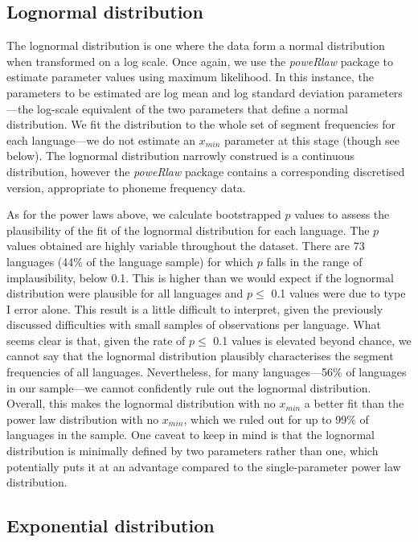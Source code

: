 \hypertarget{lognormal-distribution}{%
\subsection{Lognormal distribution}\label{lognormal-distribution}}

The lognormal distribution is one where the data form a normal distribution when transformed on a log scale. Once again, we use the \emph{poweRlaw} package \autocite{gillespie_fitting_2014} to estimate parameter values using maximum likelihood. In this instance, the parameters to be estimated are log mean and log standard deviation parameters---the log-scale equivalent of the two parameters that define a normal distribution. We fit the distribution to the whole set of segment frequencies for each language---we do not estimate an \(x_{min}\) parameter at this stage (though see below). The lognormal distribution narrowly construed is a continuous distribution, however the \emph{poweRlaw} package contains a corresponding discretised version, appropriate to phoneme frequency data.

As for the power laws above, we calculate bootstrapped \(p\) values to assess the plausibility of the fit of the lognormal distribution for each language. The \(p\) values obtained are highly variable throughout the dataset. There are 73 languages (44\% of the language sample) for which \(p\) falls in the range of implausibility, below 0.1. This is higher than we would expect if the lognormal distribution were plausible for all languages and \(p \leq\) 0.1 values were due to type I error alone. This result is a little difficult to interpret, given the previously discussed difficulties with small samples of observations per language. What seems clear is that, given the rate of \(p \leq\) 0.1 values is elevated beyond chance, we cannot say that the lognormal distribution plausibly characterises the segment frequencies of all languages. Nevertheless, for many languages---56\% of languages in our sample---we cannot confidently rule out the lognormal distribution. Overall, this makes the lognormal distribution with no \(x_{min}\) a better fit than the power law distribution with no \(x_{min}\), which we ruled out for up to 99\% of languages in the sample. One caveat to keep in mind is that the lognormal distribution is minimally defined by two parameters rather than one, which potentially puts it at an advantage compared to the single-parameter power law distribution.

\hypertarget{exponential-distribution}{%
\subsection{Exponential distribution}\label{exponential-distribution}}

